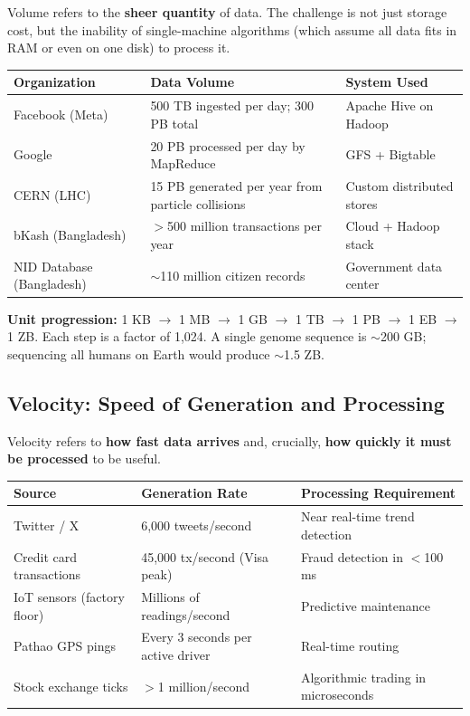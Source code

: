 \documentclass[12pt,a4paper]{article}
\begin{document}
Volume refers to the \textbf{sheer quantity} of data. The challenge is not just storage cost, but the inability of single-machine algorithms (which assume all data fits in RAM or even on one disk) to process it.

\begin{center}
\renewcommand{\arraystretch}{1.35}
\begin{tabular}{p{3.0cm}p{5.5cm}p{4.0cm}}
  \toprule
  \textbf{Organization} & \textbf{Data Volume} & \textbf{System Used} \\
  \midrule
  Facebook (Meta) & 500 TB ingested per day; 300 PB total & Apache Hive on Hadoop \\
  Google & 20 PB processed per day by MapReduce & GFS + Bigtable \\
  CERN (LHC) & 15 PB generated per year from particle collisions & Custom distributed stores \\
  bKash (Bangladesh) & $>$500 million transactions per year & Cloud + Hadoop stack \\
  NID Database (Bangladesh) & $\sim$110 million citizen records & Government data center \\
  \bottomrule
\end{tabular}
\end{center}

\textbf{Unit progression:} 1 KB $\to$ 1 MB $\to$ 1 GB $\to$ 1 TB $\to$ 1 PB $\to$ 1 EB $\to$ 1 ZB. Each step is a factor of 1,024. A single genome sequence is $\sim$200 GB; sequencing all humans on Earth would produce $\sim$1.5 ZB.

\subsection{Velocity: Speed of Generation and Processing}

Velocity refers to \textbf{how fast data arrives} and, crucially, \textbf{how quickly it must be processed} to be useful.

\begin{center}
\renewcommand{\arraystretch}{1.35}
\begin{tabular}{p{4.5cm}p{3.5cm}p{4.5cm}}
  \toprule
  \textbf{Source} & \textbf{Generation Rate} & \textbf{Processing Requirement} \\
  \midrule
  Twitter / X & 6{,}000 tweets/second & Near real-time trend detection \\
  Credit card transactions & 45{,}000 tx/second (Visa peak) & Fraud detection in $<$100 ms \\
  IoT sensors (factory floor) & Millions of readings/second & Predictive maintenance \\
  Pathao GPS pings & Every 3 seconds per active driver & Real-time routing \\
  Stock exchange ticks & $>$1 million/second & Algorithmic trading in microseconds \\
  \bottomrule
\end{tabular}
\end{center}
\end{document}
